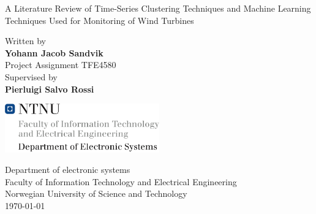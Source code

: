 \documentclass[11pt,english,a4paper,openright]{report} %
\begin{document}
\setlength\parindent{0pt} %

\pagestyle{fancy}

\begin{titlepage}
    \begin{center}
    
    \LARGE 
    A Literature Review of Time-Series Clustering Techniques and Machine Learning Techniques Used for Monitoring of Wind Turbines \\
    \vspace{1cm}

    \Large
    Written by\\
    \vspace{0.1cm}
    \textbf{Yohann  Jacob Sandvik}\\
    \vspace{1cm}
    \large
    Project Assignment TFE4580 \\
    \vspace{0.5cm}
    Supervised by\\
    \vspace{0.1cm}
    \textbf{Pierluigi Salvo Rossi}\\
    \vspace{2cm}

    \includegraphics[width=0.5\textwidth]{ntnu_logo}
    
    \vspace{1cm}
    \large
    Department of electronic systems\\
    Faculty of Information Technology and Electrical Engineering\\
    Norwegian University of Science and Technology\\
    \today

\end{center}
\end{titlepage}
\end{document}
